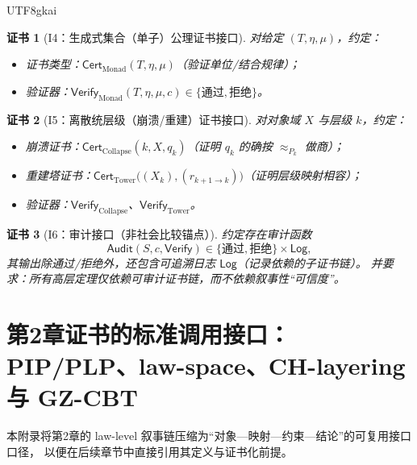\documentclass[12pt]{article}
\newtheorem{Certificate}{证书}[section]
\begin{document}
\begin{CJK*}{UTF8}{gkai}
\begin{Certificate}[I4：生成式集合（单子）公理证书接口]
\label{cert:tex19-appA-I4-monad}
对给定 $(T,\eta,\mu)$，约定：
\begin{itemize}
  \item 证书类型：$\mathsf{Cert}_{\mathrm{Monad}}(T,\eta,\mu)$（验证单位/结合规律）；
  \item 验证器：$\mathsf{Verify}_{\mathrm{Monad}}(T,\eta,\mu,c)\in\{\text{通过},\text{拒绝}\}$。
\end{itemize}
\end{Certificate}

\begin{Certificate}[I5：离散统层级（崩溃/重建）证书接口]
\label{cert:tex19-appA-I5-tower}
对对象域 $X$ 与层级 $k$，约定：
\begin{itemize}
  \item 崩溃证书：$\mathsf{Cert}_{\mathrm{Collapse}}(k,X,q_k)$（证明 $q_k$ 的确按 $\approx_{P_k}$ 做商）；
  \item 重建塔证书：$\mathsf{Cert}_{\mathrm{Tower}}\bigl((X_k),(r_{k+1\to k})\bigr)$（证明层级映射相容）；
  \item 验证器：$\mathsf{Verify}_{\mathrm{Collapse}}$、$\mathsf{Verify}_{\mathrm{Tower}}$。
\end{itemize}
\end{Certificate}

\begin{Certificate}[I6：审计接口（非社会比较锚点）]
\label{cert:tex19-appA-I6-audit}
约定存在审计函数
\[
\mathsf{Audit}(S,c,\mathsf{Verify})\in\{\text{通过},\text{拒绝}\}\times \mathsf{Log},
\]
其输出除通过/拒绝外，还包含可追溯日志 $\mathsf{Log}$（记录依赖的子证书链）。
并要求：所有高层定理仅依赖可审计证书链，而不依赖叙事性“可信度”。
\end{Certificate}

\clearpage

\section{第2章证书的标准调用接口：PIP/PLP、law-space、CH-layering 与 GZ-CBT}
\label{sec:tex19-appB-standard-interface}

本附录将第2章的 law-level 叙事链压缩为“对象—映射—约束—结论”的可复用接口口径，
以便在后续章节中直接引用其定义与证书化前提。


\end{CJK*}
\end{document}
